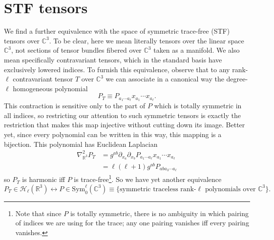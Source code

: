 \documentclass[11pt,letterpaper]{article}
\newcommand{\mc}[1]{\mathcal{#1}}
\newcommand{\R}{\mathbb{R}}
\newcommand{\C}{\mathbb{C}}
\newcommand{\D}{\partial}
\begin{document}
\section{STF tensors}
We find a further equivalence with the space of symmetric trace-free (STF) tensors over $\C^3$. To be clear, here we mean literally tensors over the linear space $\C^3$, not sections of tensor bundles fibered over $\C^3$ taken as a manifold. We also mean specifically contravariant tensors, which in the standard basis have exclusively lowered indices. To furnish this equivalence, observe that to any rank-$\ell$ contravariant tensor $T$ over $\C^3$ we can associate in a canonical way the degree-$\ell$ homogeneous polynomial \begin{equation}
P_T \equiv P_{a_1 \cdots a_\ell} x_{a_1} \cdots x_{a_\ell}.
\end{equation}
This contraction is sensitive only to the part of $P$ which is totally symmetric in all indices, so restricting our attention to such symmetric tensors is exactly the restriction that makes this map injective without cutting down its image. Better yet, since every polynomial can be written in this way, this mapping is a bijection. This polynomial has Euclidean Laplacian \begin{equation}
\begin{aligned}
\nabla^2_{\R^3} P_T & = g^{ab} \D_{x_a} \D_{x_b} P_{a_1 \cdots a_\ell} x_{a_1} \cdots x_{a_\ell} \\
& = \ell(\ell + 1) g^{ab} P_{a b a_3 \cdots a_\ell}
\end{aligned}
\end{equation}
so $P_T$ is harmonic iff $P$ is trace-free\footnote{Note that since $P$ is totally symmetric, there is no ambiguity in which pairing of indices we are using for the trace; any one pairing vanishes iff every pairing vanishes.}. So we have yet another equivalence \begin{equation}
P_T \in \mc{H}_\ell(\R^3) \leftrightarrow P \in \mbox{Sym}_0^\ell(\C^3) \equiv \{ \mbox{symmetric traceless rank-$\ell$ polynomials over $\C^3$}\}.
\end{equation}
\end{document}
